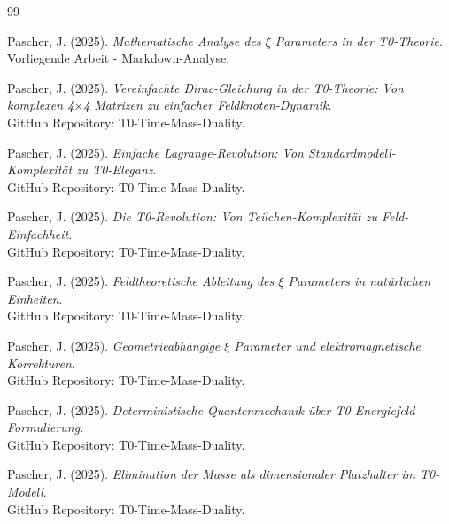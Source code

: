 	\begin{thebibliography}{99}
		
		Pascher, J. (2025). \textit{Mathematische Analyse des $\xi$ Parameters in der T0-Theorie}. \\
		Vorliegende Arbeit - Markdown-Analyse.
		
		Pascher, J. (2025). \textit{Vereinfachte Dirac-Gleichung in der T0-Theorie: Von komplexen 4$\times$4 Matrizen zu einfacher Feldknoten-Dynamik}. \\
		GitHub Repository: T0-Time-Mass-Duality.
		
		Pascher, J. (2025). \textit{Einfache Lagrange-Revolution: Von Standardmodell-Komplexität zu T0-Eleganz}. \\
		GitHub Repository: T0-Time-Mass-Duality.
		
		Pascher, J. (2025). \textit{Die T0-Revolution: Von Teilchen-Komplexität zu Feld-Einfachheit}. \\
		GitHub Repository: T0-Time-Mass-Duality.
		
		Pascher, J. (2025). \textit{Feldtheoretische Ableitung des $\xi$ Parameters in natürlichen Einheiten}. \\
		GitHub Repository: T0-Time-Mass-Duality.
		
		Pascher, J. (2025). \textit{Geometrieabhängige $\xi$ Parameter und elektromagnetische Korrekturen}. \\
		GitHub Repository: T0-Time-Mass-Duality.
		
		Pascher, J. (2025). \textit{Deterministische Quantenmechanik über T0-Energiefeld-Formulierung}. \\
		GitHub Repository: T0-Time-Mass-Duality.
		
		Pascher, J. (2025). \textit{Elimination der Masse als dimensionaler Platzhalter im T0-Modell}. \\
		GitHub Repository: T0-Time-Mass-Duality.
		
	\end{thebibliography}
	